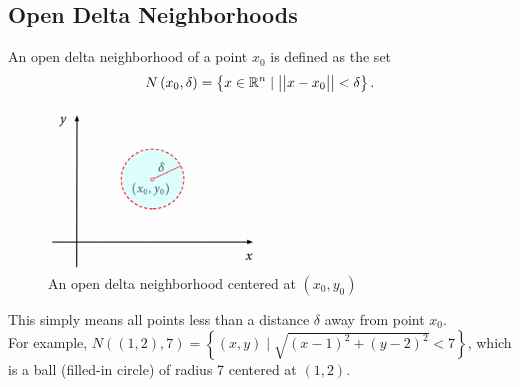 \subsection{Open Delta Neighborhoods}
\noindent
An open delta neighborhood of a point $x_0$ is defined as the set
\begin{equation*}
	N\left(x_0, \delta\right) = \left\{x \in \mathbb{R}^n \mid \big\lvert \big\lvert x-x_0 \big\rvert \big\rvert < \delta\right\}.
\end{equation*}

\begin{figure}[H]
	\centering
	\includegraphics[width=0.5\textwidth]{./Images/differentialMultivariableCalculus/open_delta.png}
	\caption{An open delta neighborhood centered at $(x_0, y_0)$}
\end{figure}

\noindent
This simply means all points less than a distance $\delta$ away from point $x_0$.\\
For example, $N( (1,2) , 7) = \left\{ (x,y) \mid \sqrt{(x-1)^2 + (y-2)^2}<7 \right\}$, which is a ball (filled-in circle) of radius 7 centered at $(1, 2)$.